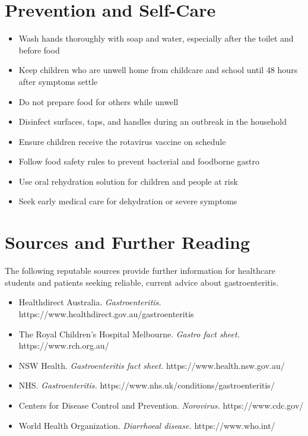 \section*{Prevention and Self-Care}
\begin{itemize}
    \item Wash hands thoroughly with soap and water, especially after the toilet and before food
    \item Keep children who are unwell home from childcare and school until 48 hours after symptoms settle
    \item Do not prepare food for others while unwell
    \item Disinfect surfaces, taps, and handles during an outbreak in the household
    \item Ensure children receive the rotavirus vaccine on schedule
    \item Follow food safety rules to prevent bacterial and foodborne gastro
    \item Use oral rehydration solution for children and people at risk
    \item Seek early medical care for dehydration or severe symptoms
\end{itemize}

\section*{Sources and Further Reading}
The following reputable sources provide further information for healthcare students and patients seeking reliable, current advice about gastroenteritis.
\begin{itemize}
    \item Healthdirect Australia. \textit{Gastroenteritis.} https://www.healthdirect.gov.au/gastroenteritis
    \item The Royal Children's Hospital Melbourne. \textit{Gastro fact sheet.} https://www.rch.org.au/
    \item NSW Health. \textit{Gastroenteritis fact sheet.} https://www.health.nsw.gov.au/
    \item NHS. \textit{Gastroenteritis.} https://www.nhs.uk/conditions/gastroenteritis/
    \item Centers for Disease Control and Prevention. \textit{Norovirus.} https://www.cdc.gov/
    \item World Health Organization. \textit{Diarrhoeal disease.} https://www.who.int/
\end{itemize}
